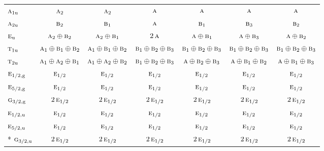 \documentclass[10pt,a4paper]{article}
\numberwithin{equation}{section}
\newcommand{\irr}[1]{\text{\normalfont\scshape #1}}
\newcommand{\ptag}[1]{\mathrm{#1}}
\begin{document}
{\begin{longtable}{@{}lcccccc@{}}
$\irr{a}_{1\ptag{u}}$ & $\irr{a}_{2}$ & $\irr{a}_{2}$ & $\irr{a}$ & $\irr{a}$ & $\irr{a}$ & $\irr{a}$\\
$\irr{a}_{2\ptag{u}}$ & $\irr{b}_{2}$ & $\irr{b}_{1}$ & $\irr{a}$ & $\irr{b}_{1}$ & $\irr{b}_{3}$ & $\irr{b}_{2}$\\
$\irr{e}_{\ptag{u}}$ & $\irr{a}_{2}\oplus \irr{b}_{2}$ & $\irr{a}_{2}\oplus \irr{b}_{1}$ & $2\,\irr{a}$ & $\irr{a}\oplus \irr{b}_{1}$ & $\irr{a}\oplus \irr{b}_{3}$ & $\irr{a}\oplus \irr{b}_{2}$\\
$\irr{t}_{1\ptag{u}}$ & $\irr{a}_{1}\oplus \irr{b}_{1}\oplus \irr{b}_{2}$ & $\irr{a}_{1}\oplus \irr{b}_{1}\oplus \irr{b}_{2}$ & $\irr{b}_{1}\oplus \irr{b}_{2}\oplus \irr{b}_{3}$ & $\irr{b}_{1}\oplus \irr{b}_{2}\oplus \irr{b}_{3}$ & $\irr{b}_{1}\oplus \irr{b}_{2}\oplus \irr{b}_{3}$ & $\irr{b}_{1}\oplus \irr{b}_{2}\oplus \irr{b}_{3}$\\
$\irr{t}_{2\ptag{u}}$ & $\irr{a}_{1}\oplus \irr{a}_{2}\oplus \irr{b}_{1}$ & $\irr{a}_{1}\oplus \irr{a}_{2}\oplus \irr{b}_{2}$ & $\irr{b}_{1}\oplus \irr{b}_{2}\oplus \irr{b}_{3}$ & $\irr{a}\oplus \irr{b}_{2}\oplus \irr{b}_{3}$ & $\irr{a}\oplus \irr{b}_{1}\oplus \irr{b}_{2}$ & $\irr{a}\oplus \irr{b}_{1}\oplus \irr{b}_{3}$\\
$\irr{e}_{1/2,\ptag{g}}$ & $\irr{e}_{1/2}$ & $\irr{e}_{1/2}$ & $\irr{e}_{1/2}$ & $\irr{e}_{1/2}$ & $\irr{e}_{1/2}$ & $\irr{e}_{1/2}$\\
$\irr{e}_{5/2,\ptag{g}}$ & $\irr{e}_{1/2}$ & $\irr{e}_{1/2}$ & $\irr{e}_{1/2}$ & $\irr{e}_{1/2}$ & $\irr{e}_{1/2}$ & $\irr{e}_{1/2}$\\
$\irr{g}_{3/2,\ptag{g}}$ & $2\,\irr{e}_{1/2}$ & $2\,\irr{e}_{1/2}$ & $2\,\irr{e}_{1/2}$ & $2\,\irr{e}_{1/2}$ & $2\,\irr{e}_{1/2}$ & $2\,\irr{e}_{1/2}$\\
$\irr{e}_{1/2,\ptag{u}}$ & $\irr{e}_{1/2}$ & $\irr{e}_{1/2}$ & $\irr{e}_{1/2}$ & $\irr{e}_{1/2}$ & $\irr{e}_{1/2}$ & $\irr{e}_{1/2}$\\
$\irr{e}_{5/2,\ptag{u}}$ & $\irr{e}_{1/2}$ & $\irr{e}_{1/2}$ & $\irr{e}_{1/2}$ & $\irr{e}_{1/2}$ & $\irr{e}_{1/2}$ & $\irr{e}_{1/2}$\\*
$\irr{g}_{3/2,\ptag{u}}$ & $2\,\irr{e}_{1/2}$ & $2\,\irr{e}_{1/2}$ & $2\,\irr{e}_{1/2}$ & $2\,\irr{e}_{1/2}$ & $2\,\irr{e}_{1/2}$ & $2\,\irr{e}_{1/2}$\\
\bottomrule\end{longtable}}
\end{document}
